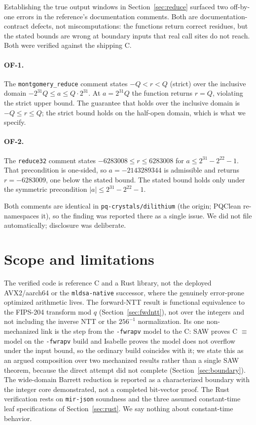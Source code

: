 \documentclass[journal=tches,submission,review]{iacrtrans}
\newcommand{\code}[1]{\texttt{#1}}
\begin{document}
Establishing the true output windows in Section~\ref{sec:reduce} surfaced two off-by-one errors in the
reference's documentation comments. Both are documentation-contract defects, not miscomputations: the
functions return correct residues, but the stated bounds are wrong at boundary inputs that real call
sites do not reach. Both were verified against the shipping C.

\paragraph{OF-1.} The \code{montgomery\_reduce} comment states $-Q < r < Q$ (strict) over the inclusive
domain $-2^{31} Q \le a \le Q \cdot 2^{31}$. At $a = 2^{31} Q$ the function returns $r = Q$, violating the
strict upper bound. The guarantee that holds over the inclusive domain is $-Q \le r \le Q$; the strict
bound holds on the half-open domain, which is what we specify.

\paragraph{OF-2.} The \code{reduce32} comment states $-6283008 \le r \le 6283008$ for $a \le 2^{31} -
2^{22} - 1$. That precondition is one-sided, so $a = -2143289344$ is admissible and returns $r =
-6283009$, one below the stated bound. The stated bound holds only under the symmetric precondition
$|a| \le 2^{31} - 2^{22} - 1$.

Both comments are identical in \code{pq-crystals/dilithium} (the origin; PQClean re-namespaces it), so
the finding was reported there as a single issue. We did not file automatically; disclosure was
deliberate.

\section{Scope and limitations}\label{sec:scope}

The verified code is reference C and a Rust library, not the deployed AVX2/aarch64 or the
\code{mldsa-native} successor, where the genuinely error-prone optimized arithmetic lives. The
forward-NTT result is functional equivalence to the FIPS-204 transform mod $q$ (Section~\ref{sec:fwdntt}),
not over the integers and not including the inverse NTT or the $256^{-1}$ normalization. Its one
non-mechanized link is the step from the \code{-fwrapv} model to the C: SAW proves C $\equiv$ model on the
\code{-fwrapv} build and Isabelle proves the model does not overflow under the input bound, so the
ordinary build coincides with it; we state this as an argued composition over two mechanized results
rather than a single SAW theorem, because the direct attempt did not complete (Section~\ref{sec:boundary}).
The wide-domain Barrett reduction is reported as a characterized boundary with the integer core
demonstrated, not a completed bit-vector proof. The Rust verification rests on \code{mir-json} soundness
and the three assumed constant-time leaf specifications of Section~\ref{sec:rust}. We say nothing about
constant-time behavior.
\end{document}
